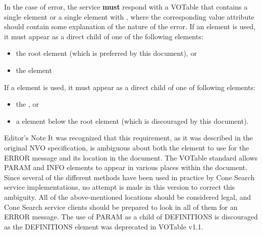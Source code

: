\documentclass[11pt,a4paper]{ivoa}
\begin{document}
In the case of error, the service \textbf{must} respond with a VOTable that contains a single  element or a single  element with , where the corresponding value attribute should contain some explanation of the nature of the error. If an  element is used, it must appear as a direct child of one of the following elements:
\begin{itemize}
	\item the root  element (which is preferred by this document), or
	\item the  element
\end{itemize}

If a  element is used, it must appear as a direct child of one of following elements:
\begin{itemize}
	\item the , or
	\item a  element below the root  element (which is discouraged by this document).
\end{itemize}
\begin{bigdescription}
	\item[Editor's Note] It was recognized that this requirement, as it was described in the original NVO specification, is ambiguous about both the element to use for the ERROR message and its location in the document. The VOTable standard allows PARAM and INFO elements to appear in various places within the document. Since several of the different methods have been used in practice by Cone Search service implementations, no attempt is made in this version to correct this ambiguity. All of the above-mentioned locations should be considered legal, and Cone Search service clients should be prepared to look in all of them for an ERROR message. The use of PARAM as a child of DEFINITIONS is discouraged as the DEFINITIONS element was deprecated in VOTable v1.1.
\end{bigdescription}
\end{document}
